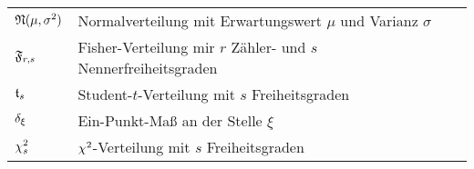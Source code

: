 
\begin{tabular}{p{1.5cm} p{12cm}}
$\mathfrak{N}( \mu, \sigma^2 )$ & Normalverteilung mit Erwartungswert $\mu$ und Varianz $\sigma$ \\
$\mathfrak{F}_{r,s}$ & Fisher-Verteilung mir $r$ Zähler- und $s$ Nennerfreiheitsgraden\\
$\mathfrak{t}_s$ & Student-$t$-Verteilung mit $s$ Freiheitsgraden \\
$\delta_\xi$ & Ein-Punkt-Maß an der Stelle $\xi$ \\
$\chi^2_s$ & $\chi^2$-Verteilung mit $s$ Freiheitsgraden \\
\end{tabular}
